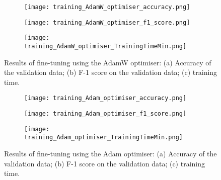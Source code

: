 \documentclass[a4paper,12pt]{article}
\newcommand{\figwidthh}{0.48\textwidth}
\begin{document}

\begin{figure}[h!] 
	\begin{center}
		\begin{subfigure}[b]{\figwidthh}
			\caption{} 
			\texttt{[image: training\_AdamW\_optimiser\_accuracy.png]}
		\end{subfigure}
        \hfill
		\begin{subfigure}[b]{\figwidthh}
			\caption{}
			\texttt{[image: training\_AdamW\_optimiser\_f1\_score.png]}
		\end{subfigure}
        \hfill
		\begin{subfigure}[b]{\figwidthh}
			\caption{}
			\texttt{[image: training\_AdamW\_optimiser\_TrainingTimeMin.png]}
		\end{subfigure}
	\end{center}
	\caption{Results of fine-tuning using the AdamW optimiser: (a) Accuracy of the validation data; (b) F-1 score on the validation data; (c) training time. 
	} 
	\label{fig:res_training_adamW}
\end{figure}


\begin{figure}[h!] 
	\begin{center}
		\begin{subfigure}[b]{\figwidthh}
			\caption{} 
			\texttt{[image: training\_Adam\_optimiser\_accuracy.png]}
		\end{subfigure}
        \hfill
		\begin{subfigure}[b]{\figwidthh}
			\caption{}
			\texttt{[image: training\_Adam\_optimiser\_f1\_score.png]}
		\end{subfigure}
        \hfill
		\begin{subfigure}[b]{\figwidthh}
			\caption{}
			\texttt{[image: training\_Adam\_optimiser\_TrainingTimeMin.png]}
		\end{subfigure}
	\end{center}
	\caption{Results of fine-tuning using the Adam optimiser: (a) Accuracy of the validation data; (b) F-1 score on the validation data; (c) training time. 
	} 
	\label{fig:res_training_adam}
\end{figure}
\end{document}
